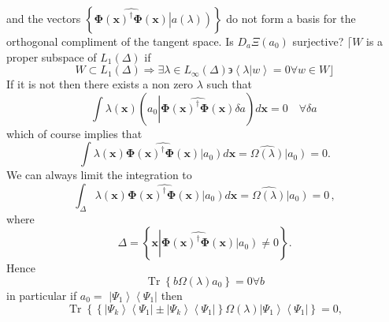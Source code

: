 \documentclass[aps,preprint]{revtex4}%
\begin{document}
and the vectors $\left\{  \widehat{\mathbf{\Phi}\left(  \mathbf{x}\right)
^{\dagger}\mathbf{\Phi}\left(  \mathbf{x}\right)  }\left\vert \overset
{}{a\left(  \lambda\right)  }\right)  \right\}  $ do not form a basis for the
orthogonal compliment of the tangent space. Is $D_{a}\Xi\left(  a_{0}\right)
$ surjective? $\lceil W$ is a proper subspace of $L_{1}\left(  \Delta\right)
$ if
\begin{equation}
W\subset L_{1}\left(  \Delta\right)  \Rightarrow\exists\lambda\in L_{\infty
}\left(  \Delta\right)  \backepsilon\left\langle \left.  \lambda\right\vert
w\right\rangle =0\forall w\in W\rfloor
\end{equation}
If it is not then there exists a non zero $\lambda$ such that
\begin{equation}
\int\lambda\left(  \mathbf{x}\right)  \left(  a_{0}\left\vert \widehat
{\mathbf{\Phi}\left(  \mathbf{x}\right)  ^{\dagger}\mathbf{\Phi}\left(
\mathbf{x}\right)  }\right.  \delta a\right)  d\mathbf{x}=0\quad\forall\delta
a\,
\end{equation}
which of course implies that
\begin{equation}
\int\lambda\left(  \mathbf{x}\right)  \widehat{\mathbf{\Phi}\left(
\mathbf{x}\right)  ^{\dagger}\mathbf{\Phi}\left(  \mathbf{x}\right)
}\left\vert \overset{}{a_{0}}\right)  d\mathbf{x}=\widehat{\Omega\left(
\lambda\right)  }\left\vert \overset{}{a_{0}}\right)  =0.
\end{equation}
We can always limit the integration to
\begin{equation}
\int_{\Delta}\lambda\left(  \mathbf{x}\right)  \widehat{\mathbf{\Phi}\left(
\mathbf{x}\right)  ^{\dagger}\mathbf{\Phi}\left(  \mathbf{x}\right)
}\left\vert \overset{}{a_{0}}\right)  d\mathbf{x}=\widehat{\Omega\left(
\lambda\right)  }\left\vert \overset{}{a_{0}}\right)  =0\,,
\end{equation}
where
\begin{equation}
\Delta=\left\{  \mathbf{x}\left\vert \widehat{\mathbf{\Phi}\left(
\mathbf{x}\right)  ^{\dagger}\mathbf{\Phi}\left(  \mathbf{x}\right)
}\left\vert \overset{}{a_{0}}\right)  \neq0\right.  \right\}  .
\end{equation}
Hence
\begin{equation}
\operatorname{Tr}\left\{  b\Omega\left(  \lambda\right)  a_{0}\right\}
=0\forall b
\end{equation}
in particular if $a_{0}=$ $\left\vert \Psi_{1}\right\rangle \left\langle
\Psi_{1}\right\vert $ then
\begin{equation}
\operatorname{Tr}\left\{  \left\{  \left\vert \Psi_{k}\right\rangle
\left\langle \Psi_{1}\right\vert \pm\left\vert \Psi_{k}\right\rangle
\left\langle \Psi_{1}\right\vert \right\}  \Omega\left(  \lambda\right)
\left\vert \Psi_{1}\right\rangle \left\langle \Psi_{1}\right\vert \right\}
=0,
\end{equation}
\end{document}
